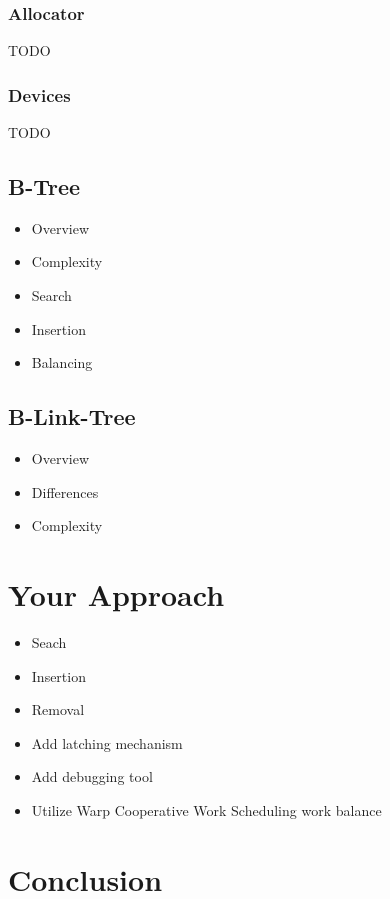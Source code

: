 \documentclass{article}
\begin{document}
\subsubsection{Allocator}

TODO

\subsubsection{Devices}

TODO


\subsection{B-Tree}
\begin{itemize}
    \item Overview
    \item Complexity
    \item Search
    \item Insertion
    \item Balancing
\end{itemize}

\subsection{B-Link-Tree}
\begin{itemize}
    \item Overview
    \item Differences
    \item Complexity
\end{itemize}

\section{Your Approach}
\begin{itemize}
    \item Seach
    \item Insertion
    \item Removal
    \item Add latching mechanism
    \item Add debugging tool
    \item Utilize Warp Cooperative Work Scheduling work balance
\end{itemize}

\section{Conclusion}


\printbibliography
\end{document}
